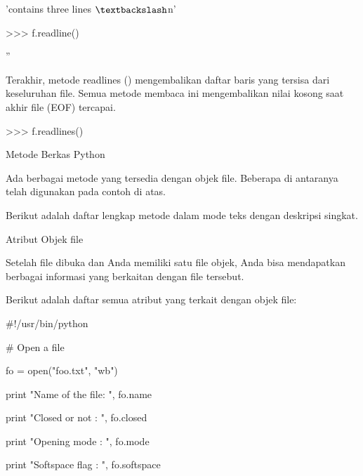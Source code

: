 'contains three lines $  \textbackslash  $n' \par
\vspace{12pt}
>>> f.readline() \par
'' \par
\vspace{12pt}
Terakhir, metode readlines () mengembalikan daftar baris yang tersisa dari keseluruhan file. Semua metode membaca ini mengembalikan nilai kosong saat akhir file (EOF) tercapai. \par
\vspace{12pt}
>>> f.readlines() \par
['This is my first file $  \textbackslash  $n', 'This file $  \textbackslash  $n', 'contains three lines $  \textbackslash  $n'] \par
\vspace{12pt}
\vspace{12pt}
Metode Berkas Python \par
\vspace{12pt}
Ada berbagai metode yang tersedia dengan objek file. Beberapa di antaranya telah digunakan pada contoh di atas. \par
\vspace{12pt}
Berikut adalah daftar lengkap metode dalam mode teks dengan deskripsi singkat. \par
\vspace{12pt}
Atribut Objek file \par
\vspace{12pt}
Setelah file dibuka dan Anda memiliki satu file objek, Anda bisa mendapatkan berbagai informasi yang berkaitan dengan file tersebut. \par
\vspace{12pt}
Berikut adalah daftar semua atribut yang terkait dengan objek file: \par
\vspace{12pt}
\vspace{12pt}
\vspace{12pt}
 $  \#  $!/usr/bin/python \par
\vspace{12pt}
 $  \#  $ Open a file \par
fo = open("foo.txt", "wb") \par
print "Name of the file: ", fo.name \par
print "Closed or not : ", fo.closed \par
print "Opening mode : ", fo.mode \par
print "Softspace flag : ", fo.softspace \par
